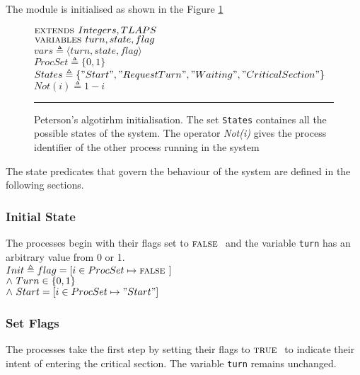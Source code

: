 \documentclass[fleqn]{tukseminar}
\begin{document}
			
			The module is initialised as shown in the Figure \ref{fig:petersonInitTla}
			
			\begin{figure}[h]
				$\mbox{\textsc{extends }} Integers, TLAPS$\\
				
				$\mbox{\textsc{variables }} turn, state, flag$\\
				$vars \triangleq  \langle turn, state, flag \rangle$\\
				$ProcSet \triangleq \{0,1\} $\\
				$States \triangleq \{"Start", "RequestTurn", "Waiting", "CriticalSection"\} $\\
				
				$Not(i) \triangleq 1-i $\\
				\hrule
				
				\caption{Peterson’s algotirhm initialisation. The set \lstinline|States| containes all the possible states of
					the system. The operator \textit{Not(i)} gives the process identifier of the other process
					running in the system}
				\label{fig:petersonInitTla}
			\end{figure}
			
			The state predicates that govern the behaviour of the system are defined in the following sections.
			
			\subsubsection{Initial State}\label{initialState}
			The processes begin with their flags set to $\mbox{\textsc{false }}$ and the variable \lstinline|turn| has an arbitrary value from 0 or 1.\\
			
			$ Init \triangleq flag = [i \in ProcSet \mapsto \mbox{\textsc{false }}]$ \\
			\hspace*{0.8cm}$\land \  Turn \in \{0,1\}$\\
			\hspace*{0.8cm}$\land \   Start =  [i \in ProcSet \mapsto "Start"]$
			
			
			\subsubsection{Set Flags}
			The processes take the first step by setting their flags to $\mbox{\textsc{true }}$ to indicate their intent of entering the critical section. The variable \lstinline|turn| remains unchanged.\\
			
\end{document}
